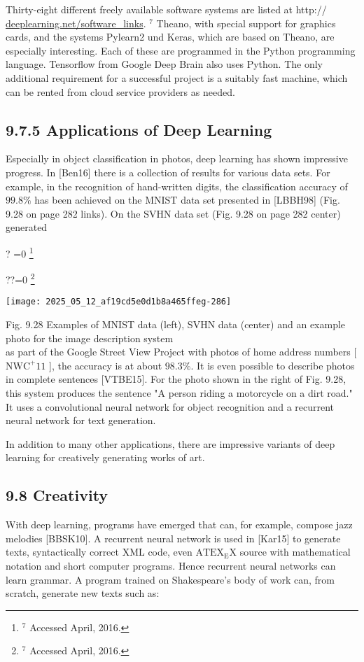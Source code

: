 \documentclass[10pt]{article}
\let\svthefootnote\thefootnote
\newcommand\blfootnotetext[1]{%
  \let\thefootnote\relax\footnote{#1}%
  \addtocounter{footnote}{-1}%
  \let\thefootnote\svthefootnote%
}
\let\svfootnotetext\footnotetext
\renewcommand\footnotetext[2][?]{%
  \if\relax#1\relax%
    \ifnum\value{footnote}=0\blfootnotetext{#2}\else\svfootnotetext{#2}\fi%
  \else%
    \if?#1\ifnum\value{footnote}=0\blfootnotetext{#2}\else\svfootnotetext{#2}\fi%
    \else\svfootnotetext[#1]{#2}\fi%
  \fi
}
\begin{document}
Thirty-eight different freely available software systems are listed at http:// \href{http://deeplearning.net/software_links}{deeplearning.net/software\_links}. ${ }^{7}$ Theano, with special support for graphics cards, and the systems Pylearn2 und Keras, which are based on Theano, are especially interesting. Each of these are programmed in the Python programming language. Tensorflow from Google Deep Brain also uses Python. The only additional requirement for a successful project is a suitably fast machine, which can be rented from cloud service providers as needed.

\subsection*{9.7.5 Applications of Deep Learning}
Especially in object classification in photos, deep learning has shown impressive progress. In [Ben16] there is a collection of results for various data sets. For example, in the recognition of hand-written digits, the classification accuracy of $99.8 \%$ has been achieved on the MNIST data set presented in [LBBH98] (Fig. 9.28 on page 282 links). On the SVHN data set (Fig. 9.28 on page 282 center) generated

\texttt{[image: 2025\_05\_12\_af19cd5e0d1b8a465ffeg-286]}

Fig. 9.28 Examples of MNIST data (left), SVHN data (center) and an example photo for the image description system\\
as part of the Google Street View Project with photos of home address numbers [ $\mathrm{NWC}^{+} 11$ ], the accuracy is at about $98.3 \%$. It is even possible to describe photos in complete sentences [VTBE15]. For the photo shown in the right of Fig. 9.28, this system produces the sentence "A person riding a motorcycle on a dirt road." It uses a convolutional neural network for object recognition 
and a recurrent neural network for text generation.

In addition to many other applications, there are impressive variants of deep learning for creatively generating works of art.

\subsection*{9.8 Creativity}
With deep learning, programs have emerged that can, for example, compose jazz melodies [BBSK10]. A recurrent neural network is used in [Kar15] to generate texts, syntactically correct XML code, even $\mathrm{ATEX}_{\mathrm{E}} \mathrm{X}$ source with mathematical notation and short computer programs. Hence recurrent neural networks can learn grammar. A program trained on Shakespeare's body of work can, from scratch, generate new texts such as:
\end{document}
